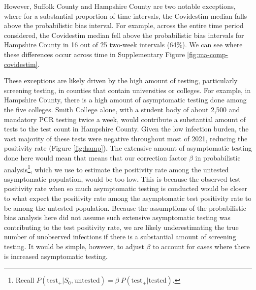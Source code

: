 \documentclass[12pt,twoside]{smiththesis}
\begin{document}
However, Suffolk County and Hampshire County are two notable exceptions, where for a substantial proportion of time-intervals, the Covidestim median falls above the probabilistic bias interval. For example, across the entire time period considered, the Covidestim median fell above the probabilistic bias intervals for Hampshire County in 16 out of 25 two-week intervals (64\%). We can see where these differences occur across time in Supplementary Figure \ref{fig:ma-comp-covidestim}.

These exceptions are likely driven by the high amount of testing, particularly screening testing, in counties that contain universities or colleges. For example, in Hampshire County, there is a high amount of asymptomatic testing done among the five colleges. Smith College alone, with a student body of about 2,500 and mandatory PCR testing twice a week, would contribute a substantial amount of tests to the test count in Hampshire County. Given the low infection burden, the vast majority of these tests were negative throughout most of 2021, reducing the positivity rate (Figure \ref{fig:hamp}). The extensive amount of asymptomatic testing done here would mean that
means that our correction factor \(\beta\) in probabilistic analysis\footnote{Recall \(P(\text{test}_+ | S_0, \text{untested}) = \beta \; P(\text{test}_+|\text{tested})\).}, which we use to estimate the positivity rate among the untested asymptomatic population, would be too low. This is because the observed test positivity rate when so much asymptomatic testing is conducted would be closer to what expect the positivity rate among the asymptomatic test positivity rate to be among the untested population. Because the assumptions of the probabilistic bias analysis here did not assume such extensive asymptomatic testing was contributing to the test positivity rate, we are likely underestimating the true number of unobserved infections if there is a substantial amount of screening testing. It would be simple, however, to adjust \(\beta\) to account for cases where there is increased asymptomatic testing.
\end{document}
